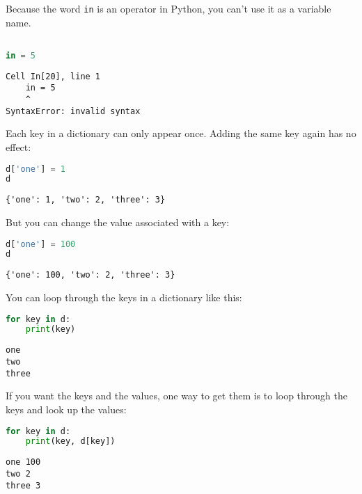 Because the word \passthrough{\lstinline!in!} is an operator in Python,
you can't use it as a variable name.

\begin{lstlisting}[language=Python,style=source]
%%expect SyntaxError

in = 5
\end{lstlisting}

\begin{lstlisting}[style=output]
  Cell In[20], line 1
    in = 5
    ^
SyntaxError: invalid syntax
\end{lstlisting}

Each key in a dictionary can only appear once. Adding the same key again
has no effect:

\begin{lstlisting}[language=Python,style=source]
d['one'] = 1
d
\end{lstlisting}

\begin{lstlisting}[style=output]
{'one': 1, 'two': 2, 'three': 3}
\end{lstlisting}

But you can change the value associated with a key:

\begin{lstlisting}[language=Python,style=source]
d['one'] = 100
d
\end{lstlisting}

\begin{lstlisting}[style=output]
{'one': 100, 'two': 2, 'three': 3}
\end{lstlisting}

You can loop through the keys in a dictionary like this:

\begin{lstlisting}[language=Python,style=source]
for key in d:
    print(key)
\end{lstlisting}

\begin{lstlisting}[style=output]
one
two
three
\end{lstlisting}

If you want the keys and the values, one way to get them is to loop
through the keys and look up the values:

\begin{lstlisting}[language=Python,style=source]
for key in d:
    print(key, d[key])
\end{lstlisting}

\begin{lstlisting}[style=output]
one 100
two 2
three 3
\end{lstlisting}


